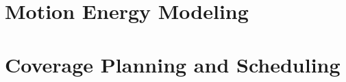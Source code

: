 

\section{Motion Energy Modeling}
\label{sec:res-ene-mot}

\section{Coverage Planning and Scheduling}
\label{sec:res-dyn}




